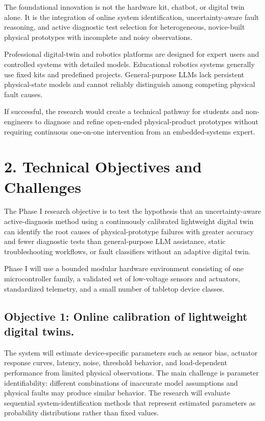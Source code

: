 The foundational innovation is not the hardware kit, chatbot, or digital twin alone. It is the integration of online system identification, uncertainty-aware fault reasoning, and active diagnostic test selection for heterogeneous, novice-built physical prototypes with incomplete and noisy observations.

Professional digital-twin and robotics platforms are designed for expert users and controlled systems with detailed models. Educational robotics systems generally use fixed kits and predefined projects. General-purpose LLMs lack persistent physical-state models and cannot reliably distinguish among competing physical fault causes.

If successful, the research would create a technical pathway for students and non-engineers to diagnose and refine open-ended physical-product prototypes without requiring continuous one-on-one intervention from an embedded-systems expert.

\section{2. Technical Objectives and Challenges}

The Phase I research objective is to test the hypothesis that an uncertainty-aware active-diagnosis method using a continuously calibrated lightweight digital twin can identify the root causes of physical-prototype failures with greater accuracy and fewer diagnostic tests than general-purpose LLM assistance, static troubleshooting workflows, or fault classifiers without an adaptive digital twin.

Phase I will use a bounded modular hardware environment consisting of one microcontroller family, a validated set of low-voltage sensors and actuators, standardized telemetry, and a small number of tabletop device classes.

\subsection{Objective 1: Online calibration of lightweight digital twins.}
The system will estimate device-specific parameters such as sensor bias, actuator response curves, latency, noise, threshold behavior, and load-dependent performance from limited physical observations. The main challenge is parameter identifiability: different combinations of inaccurate model assumptions and physical faults may produce similar behavior. The research will evaluate sequential system-identification methods that represent estimated parameters as probability distributions rather than fixed values.

